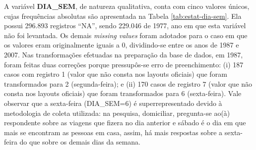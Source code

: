 A variável \textbf{DIA_SEM}, de natureza qualitativa, conta com cinco valores únicos, cujas frequências absolutas são apresentada na Tabela \ref{tab:estat-dia-sem}.
Ela possui 296.893 registros ``NA'', sendo 229.046 de 1977, ano em que esta variável não foi levantada.
Os demais \textit{missing values} foram adotados para o caso em que os valores eram originalmente iguais a 0, dividindo-se entre os anos de 1987 e 2007.
Nas transformações efetuadas na preparação da base de dados, em 1987, foram feitas duas correções porque pressupôs-se erro de preenchimento:
(i) 187 casos com registro 1 (valor que não consta nos layouts oficiais) que foram transformados para 2 (segunda-feira); e (ii) 170 casos de registro 7 (valor que não consta nos layouts oficiais) que foram transformados para 6 (sexta-feira).
Vale observar que a sexta-feira (DIA_SEM=6) é superrepresentado devido à metodologia de coleta utilizada: na pesquisa, domiciliar, pregunta-se ao(à) respondente sobre as viagens que fizera no dia anterior e sábado é o dia em que mais se encontram as pessoas em casa, assim, há mais respostas sobre a sexta-feira do que sobre os demais dias da semana.

\begin{table}[htb]

\end{table}

